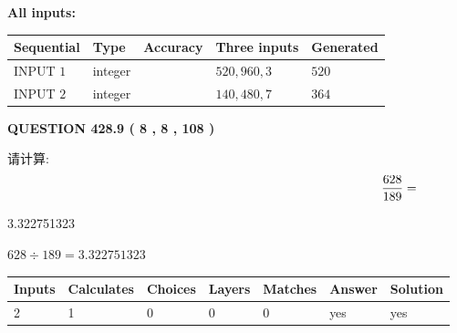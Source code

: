 \documentclass{ctexart}
\begin{document}
   
   
   
\noindent\vspace{0.1in}\hspace{-0.08in} {\textbf{\Large{All inputs: }}}
   
   
  
  
\noindent\begin{tabular}{|l|l|l|l|l|}
\hline
 Sequential & Type & Accuracy & Three inputs & Generated \\ 
\hline
 
 
  INPUT $  1 $ & integer &  & $
 520
 , 
 960
 , 
 3
 $ & $ 520 $ 
 \\  \hline  
 
 
  INPUT $  2 $ & integer &  & $
 140
 , 
 480
 , 
 7
 $ & $ 364 $ 
 \\  \hline  
 \end{tabular}
   
   
  
\vspace{0.2in}
  
{\textbf{\Large{QUESTION
428.9 
 ( 8 , 8 , 108 )
}}}
  
  
 
请计算:
\begin{equation}
\frac { %
628 }  {  %
189} = \nonumber
\end{equation}
 
 
 
\noindent{}
 
 

3.322751323
 
 
\noindent{}
 
 

 
 
 
\noindent{}
 
 

$ %
628 \div  %
189=   %
3.322751323$
 
 
\noindent{}
 
 

 
   
   
   
   
\noindent\begin{tabular}{|l|l|l|l|l|l|l|}
 \hline
Inputs & Calculates & Choices & Layers & Matches & Answer & Solution \\ \hline
 2  & 
 1  & 
 0
  & 
 0  & 
 0  & 
  yes & 
  yes 
  \\ \hline
 \end{tabular}
   
\end{document}
